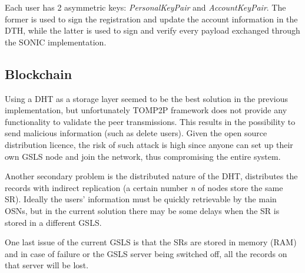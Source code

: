 Each user has 2 asymmetric keys: \textit{PersonalKeyPair} and \textit{AccountKeyPair}. The former is used to sign the registration and update the account information in the DTH, while the latter is used to sign and verify every payload exchanged through the SONIC implementation.

\subsection{Blockchain}

Using a DHT as a storage layer seemed to be the best solution in the previous implementation, but unfortunately TOMP2P framework \cite{tomp2p:2017} does not provide any functionality to validate the peer transmissions. 
This results in the possibility to send malicious information (such as delete users).
Given the open source distribution licence, the risk of such attack is high since anyone can set up their own GSLS node and join the network, thus compromising the entire system. \par

Another secondary problem is the distributed nature of the DHT, distributes the records with indirect replication \cite{_tomp2p_2017} (a certain number \textit{n} of nodes store the same SR). Ideally the users' information must be quickly retrievable by the main OSNs, but in the current solution there may be some delays when the SR is stored in a different GSLS. \par

One last issue of the current GSLS is that the SRs are stored in memory (RAM) and in case of failure or the GSLS server being switched off, all the records on that server will be lost. \par













